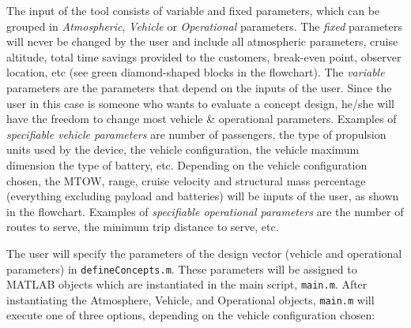 The input of the tool consists of variable and fixed parameters, which can be grouped in \textit{Atmospheric}, \textit{Vehicle} or \textit{Operational} parameters. The \textit{fixed} parameters will never be changed by the user and include all atmospheric parameters, cruise altitude, total time savings provided to the customers, break-even point, observer location, etc (see green diamond-shaped blocks in the flowchart). The \textit{variable} parameters are the parameters that depend on the inputs of the user. Since the user in this case is someone who wants to evaluate a concept design, he/she will have the freedom to change most vehicle \& operational parameters. Examples of \textit{specifiable vehicle parameters} are number of passengers, the type of propulsion units used by the device, the vehicle configuration, the vehicle maximum dimension the type of battery, etc. Depending on the vehicle configuration chosen, the MTOW, range, cruise velocity and structural mass percentage (everything excluding payload and batteries) will be inputs of the user, as shown in the flowchart.  Examples of \textit{specifiable operational parameters} are the number of routes to serve, the minimum trip distance to serve, etc.



The user will specify the parameters of the design vector (vehicle and operational parameters) in \newline \texttt{defineConcepts.m}. These parameters will be assigned to MATLAB objects which are instantiated in the main script, \texttt{main.m}. After instantiating the Atmosphere, Vehicle, and Operational objects, \texttt{main.m} will execute one of three options, depending on the vehicle configuration chosen:

